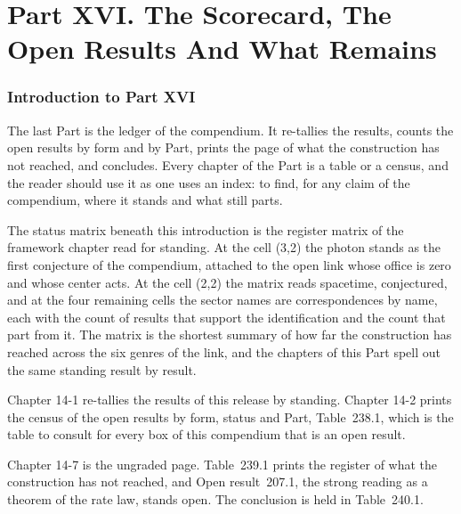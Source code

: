 \clearpage
\part*{Part XVI. The Scorecard, The Open Results And What Remains}
\label{atlaspart:16-scorecard}
\section*{Introduction to Part XVI}\label{narr:part:XIV}
\par\noindent{}\par\medskip
The last Part is the ledger of the compendium. It re-tallies the results, counts the open results by form and by Part, prints the page of what the construction has not reached, and concludes. Every chapter of the Part is a table or a census, and the reader should use it as one uses an index: to find, for any claim of the compendium, where it stands and what still parts.

The status matrix beneath this introduction is the register matrix of the framework chapter read for standing. At the cell (3,2) the photon stands as the first conjecture of the compendium, attached to the open link whose office is zero and whose center acts. At the cell (2,2) the matrix reads spacetime, conjectured, and at the four remaining cells the sector names are correspondences by name, each with the count of results that support the identification and the count that part from it. The matrix is the shortest summary of how far the construction has reached across the six genres of the link, and the chapters of this Part spell out the same standing result by result.

Chapter 14-1 re-tallies the results of this release by standing. Chapter 14-2 prints the census of the open results by form, status and Part, Table~238.1, which is the table to consult for every box of this compendium that is an open result.

Chapter 14-7 is the ungraded page. Table~239.1 prints the register of what the construction has not reached, and Open result~207.1, the strong reading as a theorem of the rate law, stands open. The conclusion is held in Table~240.1.

